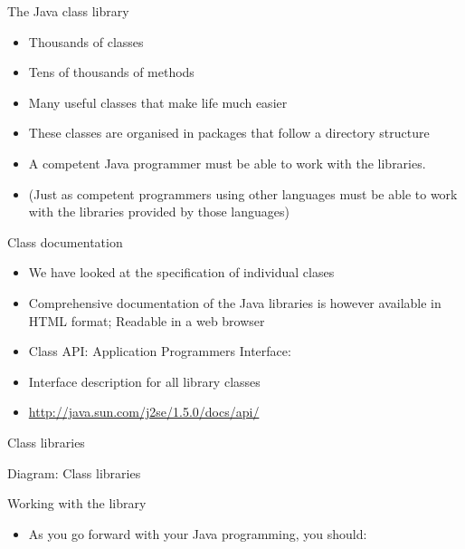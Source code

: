 \documentclass{beamer}
\begin{document}
\begin{frame} 

The Java class library

\begin{itemize}
\item Thousands of classes
\item Tens of thousands of methods
\item Many useful classes that make life much easier
\item These classes are organised in packages that follow a directory structure
\item A competent Java programmer must be able to work with the libraries.
\item (Just as competent programmers using other languages must be able to work with the libraries provided by those
languages)
\end{itemize}

\end{frame} \begin{frame}

Class documentation

\begin{itemize}
\item We have looked at the specification of individual clases
\item Comprehensive documentation of the Java libraries is however available in HTML format; Readable in a web browser
\item Class API: Application Programmers Interface: 
\end{itemize}

\begin{itemize}
\item Interface description for all library classes
\item \url{http://java.sun.com/j2se/1.5.0/docs/api/}
\end{itemize}

\end{frame} \begin{frame}

Class libraries

Diagram: Class libraries

\end{frame} \begin{frame}

Working with the library

\begin{itemize}
\item As you go forward with your Java programming, you should:


\end{itemize}
\end{frame}
\end{document}
